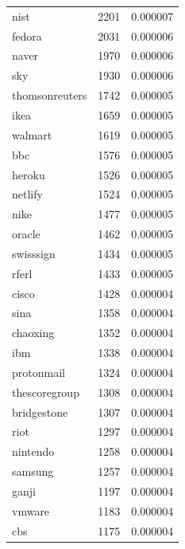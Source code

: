 \begin{tabular}{lrr}
nist & 2201 & 0.000007 \\
fedora & 2031 & 0.000006 \\
naver & 1970 & 0.000006 \\
sky & 1930 & 0.000006 \\
thomsonreuters & 1742 & 0.000005 \\
ikea & 1659 & 0.000005 \\
walmart & 1619 & 0.000005 \\
bbc & 1576 & 0.000005 \\
heroku & 1526 & 0.000005 \\
netlify & 1524 & 0.000005 \\
nike & 1477 & 0.000005 \\
oracle & 1462 & 0.000005 \\
swisssign & 1434 & 0.000005 \\
rferl & 1433 & 0.000005 \\
cisco & 1428 & 0.000004 \\
sina & 1358 & 0.000004 \\
chaoxing & 1352 & 0.000004 \\
ibm & 1338 & 0.000004 \\
protonmail & 1324 & 0.000004 \\
thescoregroup & 1308 & 0.000004 \\
bridgestone & 1307 & 0.000004 \\
riot & 1297 & 0.000004 \\
nintendo & 1258 & 0.000004 \\
samsung & 1257 & 0.000004 \\
ganji & 1197 & 0.000004 \\
vmware & 1183 & 0.000004 \\
cbs & 1175 & 0.000004 \\
\bottomrule
\end{tabular}
